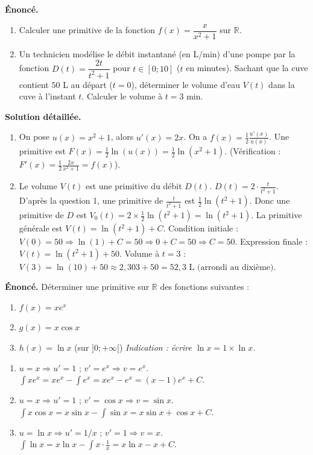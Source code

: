 \documentclass[11pt]{article}
\begin{document}
\begin{exoresolu}
\textbf{Énoncé.} 
\begin{enumerate}
    \item Calculer une primitive de la fonction $f(x)=\dfrac{x}{x^2+1}$ sur $\mathbb{R}$.
    \item Un technicien modélise le débit instantané (en L/min) d'une pompe par la fonction $D(t)=\dfrac{2t}{t^2+1}$ pour $t \in [0; 10]$ ($t$ en minutes). 
    Sachant que la cuve contient $50$ L au départ ($t=0$), déterminer le volume d'eau $V(t)$ dans la cuve à l'instant $t$. Calculer le volume à $t=3$ min.
\end{enumerate}
\textbf{Solution détaillée.}
\begin{enumerate}
    \item On pose $u(x)=x^2+1$, alors $u'(x)=2x$. On a $f(x)=\frac{1}{2}\frac{u'(x)}{u(x)}$.
    Une primitive est $F(x)=\frac{1}{2}\ln(u(x))=\frac{1}{2}\ln(x^2+1)$.
    (Vérification : $F'(x)=\frac{1}{2}\frac{2x}{x^2+1}=f(x)$).
    \item Le volume $V(t)$ est une primitive du débit $D(t)$.
    $D(t)=2 \cdot \frac{t}{t^2+1}$. D'après la question 1, une primitive de $\frac{t}{t^2+1}$ est $\frac{1}{2}\ln(t^2+1)$.
    Donc une primitive de $D$ est $V_0(t)=2 \times \frac{1}{2}\ln(t^2+1)=\ln(t^2+1)$.
    La primitive générale est $V(t)=\ln(t^2+1)+C$.
    Condition initiale : $V(0)=50 \Rightarrow \ln(1)+C=50 \Rightarrow 0+C=50 \Rightarrow C=50$.
    Expression finale : $\boxed{V(t)=\ln(t^2+1)+50}$.
    Volume à $t=3$ : $V(3)=\ln(10)+50 \approx 2{,}303+50 = \boxed{52{,}3 \text{ L (arrondi au dixième)}}$.
\end{enumerate}
\end{exoresolu}

\begin{exercice}
\textbf{Énoncé.} Déterminer une primitive sur $\mathbb{R}$ des fonctions suivantes :
\begin{enumerate}
    \item $f(x)=x e^x$
    \item $g(x)=x \cos x$
    \item $h(x)=\ln x$ (sur $]0;+\infty[$) \textit{Indication : écrire $\ln x = 1 \times \ln x$.}
\end{enumerate}
\end{exercice}

\begin{corrige}[Exercice 4]
\begin{enumerate}
    \item $u=x \Rightarrow u'=1$ ; $v'=e^x \Rightarrow v=e^x$. $\int x e^x = x e^x - \int e^x = x e^x - e^x = (x-1)e^x + C$.
    \item $u=x \Rightarrow u'=1$ ; $v'=\cos x \Rightarrow v=\sin x$. $\int x \cos x = x \sin x - \int \sin x = x \sin x + \cos x + C$.
    \item $u=\ln x \Rightarrow u'=1/x$ ; $v'=1 \Rightarrow v=x$. $\int \ln x = x \ln x - \int x \cdot \frac{1}{x} = x \ln x - x + C$.
\end{enumerate}
\end{corrige}
\end{document}

